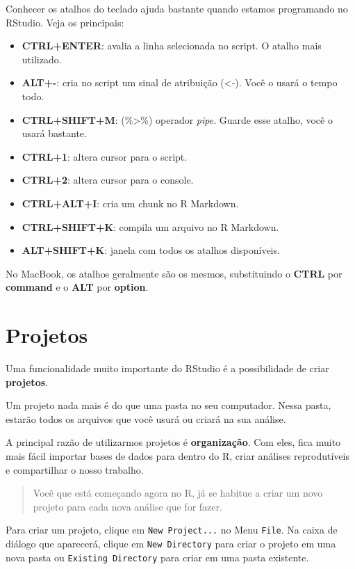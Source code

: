 \documentclass[
]{book}
\providecommand{\tightlist}{%
  \setlength{\itemsep}{0pt}\setlength{\parskip}{0pt}}
\begin{document}
Conhecer os atalhos do teclado ajuda bastante quando estamos programando no RStudio. Veja os principais:

\begin{itemize}
\tightlist
\item
  \textbf{CTRL+ENTER}: avalia a linha selecionada no script. O atalho mais utilizado.
\item
  \textbf{ALT+-}: cria no script um sinal de atribuição (\textless-). Você o usará o tempo todo.
\item
  \textbf{CTRL+SHIFT+M}: (\%\textgreater\%) operador \emph{pipe}. Guarde esse atalho, você o usará bastante.
\item
  \textbf{CTRL+1}: altera cursor para o script.
\item
  \textbf{CTRL+2}: altera cursor para o console.
\item
  \textbf{CTRL+ALT+I}: cria um chunk no R Markdown.
\item
  \textbf{CTRL+SHIFT+K}: compila um arquivo no R Markdown.
\item
  \textbf{ALT+SHIFT+K}: janela com todos os atalhos disponíveis.
\end{itemize}

No MacBook, os atalhos geralmente são os mesmos, substituindo o \textbf{CTRL} por \textbf{command} e o \textbf{ALT} por \textbf{option}.

\hypertarget{projetos}{%
\section{Projetos}\label{projetos}}

Uma funcionalidade muito importante do RStudio é a possibilidade de criar \textbf{projetos}.

Um projeto nada mais é do que uma pasta no seu computador. Nessa pasta, estarão todos os arquivos que você usurá ou criará na sua análise.

A principal razão de utilizarmos projetos é \textbf{organização}. Com eles, fica muito mais fácil importar bases de dados para dentro do R, criar análises reprodutíveis e compartilhar o nosso trabalho.

\begin{quote}
Você que está começando agora no R, já se habitue a criar um novo projeto para cada nova análise que for fazer.
\end{quote}

Para criar um projeto, clique em \texttt{New\ Project...} no Menu \texttt{File}. Na caixa de diálogo que aparecerá, clique em \texttt{New\ Directory} para criar o projeto em uma nova pasta ou \texttt{Existing\ Directory} para criar em uma pasta existente.
\end{document}
